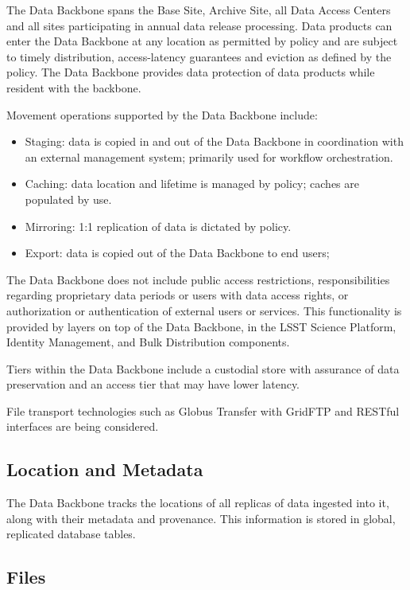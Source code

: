 \documentclass[DM,lsstdraft,toc]{lsstdoc}
\begin{document}
The Data Backbone spans the Base Site, Archive Site, all Data Access Centers
and all sites participating in annual data release processing.  Data products
can enter the Data Backbone at any location as permitted by policy and are
subject to timely distribution, access-latency guarantees and eviction as
defined by the policy. The Data Backbone provides data protection of data
products while resident with the backbone.

Movement operations supported by the Data Backbone include:
\begin{itemize}
	\item Staging: data is copied in and out of the Data Backbone in coordination with an external management system; primarily used for workflow orchestration.
	\item Caching: data location and lifetime is managed by policy; caches are populated by use.
	\item Mirroring: 1:1 replication of data is dictated by policy.
	\item Export: data is copied out of the Data Backbone to end users; 
\end{itemize}

The Data Backbone does not include public access restrictions, responsibilities
regarding proprietary data periods or users with data access rights, or
authorization or authentication of external users or services. This
functionality is provided by layers on top of the Data Backbone, in the
LSST Science Platform, Identity Management, and Bulk Distribution components.

Tiers within the Data Backbone include a custodial store with assurance of
data preservation and an access tier that may have lower latency.

File transport technologies such as Globus Transfer \citep{GlobusTransfer} with
GridFTP and RESTful interfaces are being considered.

\subsection{Location and Metadata}\label{dbb-location-and-metadata}

The Data Backbone tracks the locations of all replicas of data ingested into
it, along with their metadata and provenance.  This information is stored in
global, replicated database tables.

\subsection{Files}\label{dbb-files}
\end{document}
